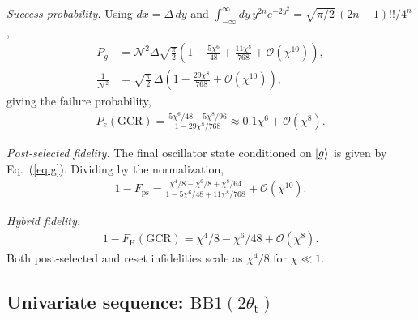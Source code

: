\documentclass[aps,prx,showpacs,notitlepage,twocolumn,superscriptaddress,nofootinbib,preprintnumbers,floatfix,10pt, longbibliography]{revtex4-2}
\begin{document}
{\medskip\noindent\textit{Success probability.}
Using $dx=\Delta\,dy$ and $\int_{-\infty}^{\infty}dy\,y^{2n}e^{-2y^2}=\sqrt{\pi/2}\,(2n-1)!!/4^n$,
\begin{align}
P_g &= \mathcal{N}^2\Delta\sqrt{\tfrac{\pi}{2}}
       \!\left(1-\tfrac{5\chi^6}{48}+\tfrac{11\chi^8}{768}
       +\mathcal{O}(\chi^{10})\right), \label{eq:succ_norm}\\
\frac{1}{\mathcal{N}^2}
    &= \sqrt{\tfrac{\pi}{2}}\,\Delta
       \!\left(1-\tfrac{29\chi^8}{768}+\mathcal{O}(\chi^{10})\right),
       \label{eq:norm}
\end{align}
giving the failure probability,
\begin{align}
P_e(\mathrm{GCR})
= \frac{5\chi^6/48-5\chi^8/96}{1-29\chi^8/768}
\approx 0.1\chi^6+\mathcal{O}(\chi^8). \label{eq:pe_gcr_app}
\end{align}

\medskip\noindent\textit{Post-selected fidelity.}
The final oscillator state conditioned on $\ket{g}$ is given by Eq.~(\ref{eq:g}). Dividing by the normalization,
\begin{align}
1-F_\mathrm{ps}
= \frac{\chi^4/8-\chi^6/8+\chi^8/64}
       {1-5\chi^6/48+11\chi^8/768}
+\mathcal{O}(\chi^{10}). \label{eq:fps_gcr}
\end{align}

\medskip\noindent\textit{Hybrid fidelity.}
\begin{align}
1-F_\mathrm{H}(\mathrm{GCR})
= \chi^4/8-\chi^6/48+\mathcal{O}(\chi^8). \label{eq:fh_gcr_app}
\end{align}
Both post-selected and reset infidelities scale as $\chi^4/8$ for $\chi\ll 1$.

\subsection{Univariate sequence: \texorpdfstring{$\mathrm{BB1}(2\theta_\mathrm{t})$}{BB1(2theta)}}
\label{app:err_BB1}

}
\end{document}
